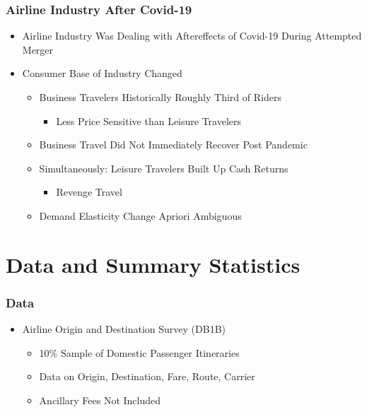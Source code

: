 \documentclass[xcolor=dvipsnames]{beamer}
\begin{document}
    \begin{frame}
        \frametitle{Airline Industry After Covid-19}
        \begin{itemize}
        \item Airline Industry Was Dealing with Aftereffects of Covid-19 During Attempted Merger
         \item Consumer Base of Industry Changed
            \begin{itemize}
                \item Business Travelers Historically Roughly Third of Riders
                \begin{itemize}
                    \item Less Price Sensitive than Leisure Travelers
                \end{itemize}
                \item Business Travel Did Not Immediately Recover Post Pandemic
                \item Simultaneously: Leisure Travelers Built Up Cash Returns
                \begin{itemize}
                    \item Revenge Travel
                \end{itemize}
                \item Demand Elasticity Change Apriori Ambiguous
            \end{itemize}
        \end{itemize}
    \end{frame}


    \section{Data and Summary Statistics}

    \begin{frame}
		\frametitle{Data}
		\begin{itemize}
			\item Airline Origin and Destination Survey (DB1B)
			\begin{itemize}
				\item 10\% Sample of Domestic Passenger Itineraries 
				\item Data on Origin, Destination, Fare, Route, Carrier
                \item Ancillary Fees Not Included 
			\end{itemize}
		\end{itemize}
	\end{frame}
\end{document}
